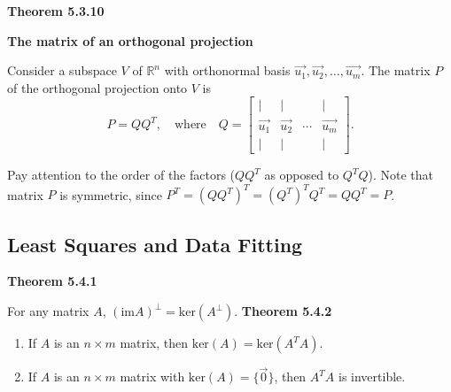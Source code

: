 \textbf{Theorem 5.3.10}\\
\par\noindent\textbf{The matrix of an orthogonal projection}
\par\noindent Consider a subspace $V$ of $\mathbb{R}^{n}$ with orthonormal basis $\vec{u_{1}},\vec{u_{2}},\ldots{},\vec{u_{m}}$. The matrix $P$ of the orthogonal projection onto $V$ is
\[P=QQ^{T},\quad\textrm{where}\quad{}Q=\left[\begin{array}{cccc}|&|&&|\\ \vec{u_{1}}&\vec{u_{2}}&\cdots{}&\vec{u_{m}}\\{} |&|&&|\end{array}\right].\]
\par\noindent Pay attention to the order of the factors ($QQ^{T}$ as opposed to $Q^{T}Q$). Note that matrix $P$ is symmetric, since $P^{T}=(QQ^{T})^{T}=(Q^{T})^{T}Q^{T}=QQ^{T}=P$.

\subsection{Least Squares and Data Fitting}
\textbf{Theorem 5.4.1}\\
\par\noindent For any matrix $A$, $(\textrm{im}A)^{\perp}=\textrm{ker}(A^{\perp})$.
\textbf{Theorem 5.4.2}\\
\renewcommand{\labelenumi}{\textbf{\alph{enumi}.}}
\begin{enumerate}
\item If $A$ is an $n\times{}m$ matrix, then $\textrm{ker}(A)=\textrm{ker}(A^{T}A)$.
\item If $A$ is an $n\times{}m$ matrix with $\textrm{ker}(A)=\{\vec{0}\}$, then $A^{T}A$ is invertible.
\end{enumerate}
